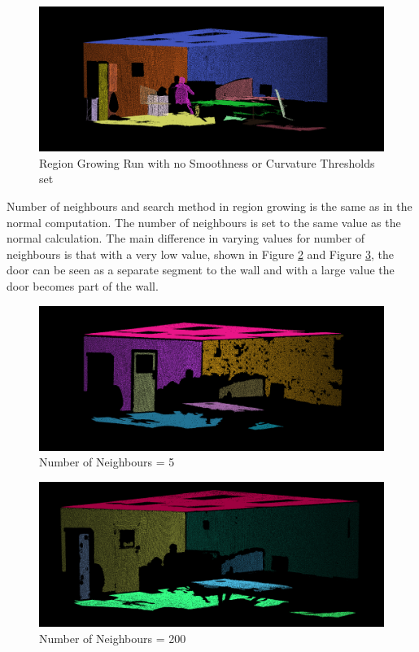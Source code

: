 		
		\begin{figure}[H]
			\centering
			\includegraphics[width=1\linewidth]{Includes/images/RegionGrowing/NoSmoothCurv}
			\caption{Region Growing Run with no Smoothness or Curvature Thresholds set}
			\label{fig:NoSmoothCurv}
		\end{figure}
	
		Number of neighbours and search method in region growing is the same as in the normal computation. The number of neighbours is set to the same value as the normal calculation. The main difference in varying values for number of neighbours is that with a very low value, shown in Figure \ref{fig:neighbours-5} and Figure \ref{fig:neighbours-200}, the door can be seen as a separate segment to the wall and with a large value the door becomes part of the wall. 
		
		
		\begin{figure}[H]
			\centering
			\includegraphics[width=1\linewidth]{Includes/images/RegionGrowing/neighbours-5}
			\caption{Number of Neighbours = 5}
			\label{fig:neighbours-5}
		\end{figure}
		
		\begin{figure}[H]
			\centering
			\includegraphics[width=1\linewidth]{Includes/images/RegionGrowing/neighbours-200}
			\caption{Number of Neighbours = 200}
			\label{fig:neighbours-200}
		\end{figure}

